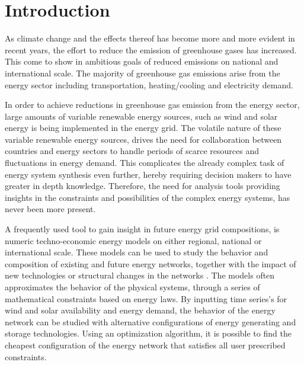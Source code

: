 
\chapter{Introduction}


As climate change and the effects thereof has become more and more evident in recent years, the effort to reduce the emission of greenhouse gases has increased. This come to show in ambitious goals of reduced emissions on national and international scale. The majority of greenhouse gas emissions arise from the energy sector including transportation, heating/cooling and electricity demand. 


In order to achieve reductions in greenhouse gas emission from the energy sector, large amounts of variable renewable energy sources, such as wind and solar energy is being implemented in the energy grid. The volatile nature of these variable renewable energy sources, drives the need for collaboration between countries and energy sectors to handle periods of scarce resources and fluctuations in energy demand. 
This complicates the already complex task of energy system synthesis even further, hereby requiring decision makers to have greater in depth knowledge. Therefore, the need for analysis tools providing insights in the constraints and possibilities of the complex energy systems, has never been more present.  

A frequently used tool to gain insight in future energy grid compositions, is numeric techno-economic energy models on either regional, national or international scale. These models can be used to study the behavior and composition of existing and future energy networks, together with the impact of new technologies or structural changes in the networks \cite{Gorm_impact_of_CO2_PYPSA}. The models often approximates the behavior of the physical systems, through a series of mathematical constraints based on energy laws. By inputting time series's for wind and solar availability and energy demand, the behavior of the energy network can be studied with alternative configurations of energy generating and storage technologies. Using an optimization algorithm, it is possible to find the cheapest configuration of the energy network that satisfies all user prescribed constraints. 

